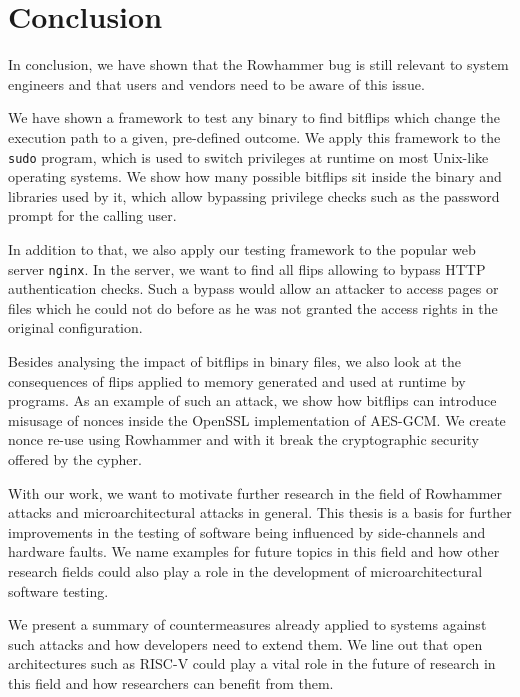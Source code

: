 \chapter{Conclusion}\label{sec:conclusion}

In conclusion, we have shown that the Rowhammer bug is still relevant to system
engineers and that users and vendors need to be aware of this issue.

We have shown a framework to test any binary to find bitflips which change the
execution path to a given, pre-defined outcome. We apply this framework to the
\texttt{sudo} program, which is used to switch privileges at runtime on most
Unix-like operating systems. We show how many possible bitflips sit inside the
binary and libraries used by it, which allow bypassing privilege checks such as
the password prompt for the calling user.

In addition to that, we also apply our testing framework to the popular web
server \texttt{nginx}. In the server, we want to find all flips allowing to
bypass HTTP authentication checks. Such a bypass would allow an attacker to
access pages or files which he could not do before as he was not granted the
access rights in the original configuration.

Besides analysing the impact of bitflips in binary files, we also look at the
consequences of flips applied to memory generated and used at runtime by
programs. As an example of such an attack, we show how bitflips can introduce
misusage of nonces inside the OpenSSL implementation of AES-GCM. We create nonce
re-use using Rowhammer and with it break the cryptographic security offered by
the cypher.

With our work, we want to motivate further research in the field of Rowhammer
attacks and microarchitectural attacks in general. This thesis is a basis for
further improvements in the testing of software being influenced by
side-channels and hardware faults. We name examples for future topics in this
field and how other research fields could also play a role in the development of
microarchitectural software testing.

We present a summary of countermeasures already applied to systems against such
attacks and how developers need to extend them. We line out that open
architectures such as RISC-V could play a vital role in the future of research
in this field and how researchers can benefit from them.

